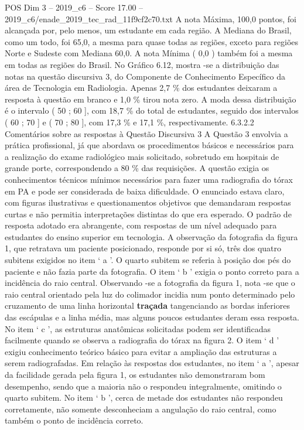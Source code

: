 \begin{textsample}{POS Dim 3 – 2019\_c6 – Score 17.00 – 2019\_c6/enade\_2019\_tec\_rad\_11f9cf2c70.txt}
A nota Máxima, 100,0 pontos, foi alcançada por, pelo menos, um estudante em cada região.
A Mediana do Brasil, como um todo, foi 65,0, a mesma para quase todas as regiões, exceto para regiões Norte e Sudeste com Mediana 60,0.
A nota Mínima ( 0,0 ) também foi a mesma em todas as regiões do Brasil.
No Gráfico 6.12, mostra -se a distribuição das notas na questão discursiva 3, do Componente de Conhecimento Específico da área de Tecnologia em Radiologia.
Apenas 2,7 \% dos estudantes deixaram a resposta à questão em branco e 1,0 \% tirou nota zero.
A moda dessa distribuição é o intervalo ( 50 ; 60 ], com 18,7 \% do total de estudantes, seguido dos intervalos ( 60 ; 70 ] e ( 70 ; 80 ], com 17,3 \% e 17,1 \%, respectivamente. 6.3.2.2 Comentários sobre as respostas à Questão Discursiva 3 A Questão 3 envolvia a prática profissional, já que abordava os procedimentos básicos e necessários para a realização do exame radiológico mais solicitado, sobretudo em hospitais de grande porte, correspondendo a 80 \% das requisições.
A questão exigia os conhecimentos técnicos mínimos necessários para fazer uma radiografia do tórax em PA e pode ser considerada de baixa dificuldade.
O enunciado estava claro, com figuras ilustrativas e questionamentos objetivos que demandaram respostas curtas e não permitia interpretações distintas do que era esperado.
O padrão de resposta adotado era abrangente, com respostas de um nível adequado para estudantes do ensino superior em tecnologia.
A observação da fotografia da figura 1, que retratava um paciente posicionado, responde por si só, três dos quatro subitens exigidos no item ‘ a ’.
O quarto subitem se referia à posição dos pés do paciente e não fazia parte da fotografia.
O item ‘ b ’ exigia o ponto correto para a incidência do raio central.
Observando -se a fotografia da figura 1, nota -se que o raio central orientado pela luz do colimador incidia num ponto determinado pelo cruzamento de uma linha horizontal \textbf{traçada} tangenciando as bordas inferiores das escápulas e a linha média, mas alguns poucos estudantes deram essa resposta.
No item ‘ c ’, as estruturas anatômicas solicitadas podem ser identificadas facilmente quando se observa a radiografia do tórax na figura 2.
O item ‘ d ’ exigiu conhecimento teórico básico para evitar a ampliação das estruturas a serem radiografadas.
Em relação às respostas dos estudantes, no item ‘ a ’, apesar da facilidade gerada pela figura 1, os estudantes não demonstraram bom desempenho, sendo que a maioria não o respondeu integralmente, omitindo o quarto subitem.
No item ‘ b ’, cerca de metade dos estudantes não respondeu corretamente, não somente desconheciam a angulação do raio central, como também o ponto de incidência correto.

\end{textsample}
